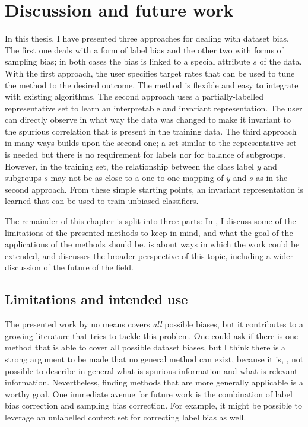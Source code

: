 \chapter{Discussion and future work}\label{ch:conclusion}
In this thesis, I have presented three approaches for dealing with dataset bias.
The first one deals with a form of label bias and the other two with forms of sampling bias;
in both cases the bias is linked to a special attribute \(s\) of the data.
%
%
With the first approach, the user specifies target rates that can be used to tune the method to the desired outcome.
The method is flexible and easy to integrate with existing algorithms.
The second approach uses a partially-labelled representative set to learn an interpretable and invariant representation.
The user can directly observe in what way the data was changed to make it invariant
to the spurious correlation that is present in the training data.
The third approach in many ways builds upon the second one;
a set similar to the representative set is needed but there is no requirement for labels nor for balance of subgroups.
However, in the training set, the relationship between the class label \(y\) and subgroups \(s\) may not be
as close to a one-to-one mapping of \(y\) and \(s\) as in the second approach.
From these simple starting points, an invariant representation is learned
that can be used to train unbiased classifiers.

The remainder of this chapter is split into three parts:
In ,
I discuss some of the limitations of the presented methods to keep in mind,
and what the goal of the applications of the methods should be.
 is about ways in which the work could be extended,
and  discusses the broader perspective of this topic,
including a wider discussion of the future of the field.

\section{Limitations and intended use}\label{sec:ch7-limitations}
%
The presented work by no means covers \emph{all} possible biases,
but it contributes to a growing literature that tries to tackle this problem.
One could ask if there is one method that is able to cover all possible dataset biases,
but I think there is a strong argument to be made that no general method can exist,
because it is, \eg, not possible to describe in general what is spurious information and what is relevant information.
Nevertheless, finding methods that are more generally applicable is a worthy goal.
One immediate avenue for future work is
the combination of label bias correction and sampling bias correction.
For example, it might be possible to leverage an unlabelled context set for correcting label bias as well.

